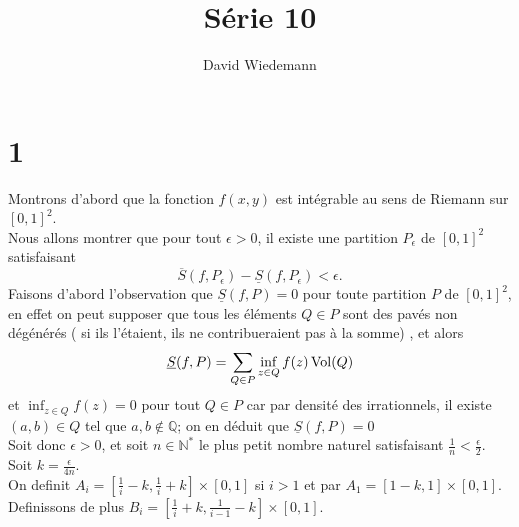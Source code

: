 \documentclass[11pt, a4paper]{article}
\begin{document}
\title{Série 10}
\author{David Wiedemann}
\maketitle
\section*{1}
Montrons d'abord que la fonction $f( x,y) $ est intégrable au sens de Riemann sur $[0,1 ]^{2}$.\\
Nous allons montrer que pour tout $\epsilon>0$, il existe une partition $P_\epsilon$ de $[0,1]^{2}$ satisfaisant
\[ 
	\overline{S}( f,P_\epsilon) -\underline { S} ( f,P_\epsilon) < \epsilon.
\]
Faisons d'abord l'observation que $\underline { S} ( f,P) =0$ pour toute partition $P$ de $ [ 0,1] ^{2}$, en effet on peut supposer que tous les éléments $Q \in P$ sont des pavés non dégénérés ( si ils l'étaient, ils ne contribueraient pas à la somme) 	, et alors
\[ 
	\underline { S} ( f,P) = \sum_{Q \in P} \inf_{z \in Q} f( z) \operatorname*{Vol}( Q) 
\]
et $\inf_{z \in Q} f( z) = 0 $ pour tout $Q \in P$ car par densité des irrationnels, il existe $ ( a,b)  \in Q$ tel que $a,b \notin \mathbb{Q}$; on en déduit que $\underline { S} ( f,P)=0$\\
\hr
Soit donc $\epsilon>0$, et soit $n \in \mathbb{N}^{*}$ le plus petit nombre naturel satisfaisant $ \frac{1}{n}< \frac{\epsilon}{2}$.\\
Soit $k = \frac{\epsilon}{4 n} $.\\
On definit $A_i = \left[ \frac{1}{i}-k, \frac{1}{i}+k\right] \times [ 0,1] $ si $i>1$ et par $A_1=\left[1-k, 1\right] \times [ 0,1]$. \\
Definissons de plus $B_i = \left[ \frac{1}{i}+k, \frac{1}{i-1} -k \right]\times [ 0,1]  $.\\
\end{document}
